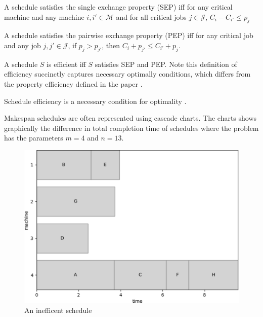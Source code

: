 \begin{definition}
	\label{sep}
	
	A schedule satisfies the single exchange property (SEP) iff for any critical machine and any machine $i,i'\in\mathcal{M}$ and for all critical jobs $j\in\mathcal{J}$, $C_i-C_{i'}\leq p_j$
\end{definition}

\begin{definition}
	\label{pep}
	
	A schedule satisfies the pairwise exchange property (PEP) iff for any critical job and any job $j,j'\in\mathcal{J}$, if $p_j>p_{j'}$, then $C_i+p_{j'}\leq C_{i'}+p_j$.
\end{definition}

\begin{definition}
	A schedule $S$ is efficient iff $S$ satisfies SEP and PEP. Note this definition of efficiency succinctly captures necessary optimally conditions, which differs from the property efficiency defined in the paper \cite{aes}.
\end{definition}

\begin{proposition}
	Schedule efficiency is a necessary condition for optimality \cite{aes}.
\end{proposition}

Makespan schedules are often represented using cascade charts. The charts shows graphically the difference in total completion time of schedules where the problem has the parameters $m=4$ and $n=13$.

\begin{figure}[H]
	\begin{center}
		\includegraphics[width=.8\linewidth]{figures/makespan_inefficient.pdf}
	\end{center}
	\caption{An inefficent schedule}
\end{figure}

